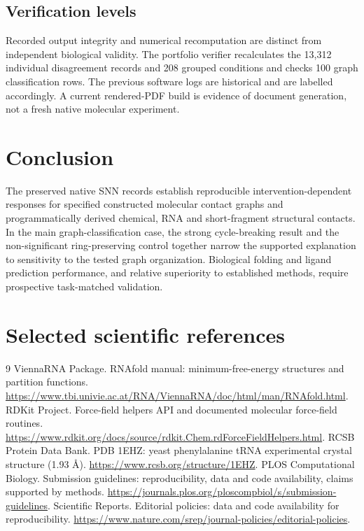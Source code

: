\documentclass[10pt,a4paper]{article}
\begin{document}
\subsection{Verification levels}
Recorded output integrity and numerical recomputation are distinct from independent biological validity. The portfolio verifier recalculates the 13,312 individual disagreement records and 208 grouped conditions and checks 100 graph classification rows. The previous software logs are historical and are labelled accordingly. A current rendered-PDF build is evidence of document generation, not a fresh native molecular experiment.

\section{Conclusion}
The preserved native SNN records establish reproducible intervention-dependent responses for specified constructed molecular contact graphs and programmatically derived chemical, RNA and short-fragment structural contacts. In the main graph-classification case, the strong cycle-breaking result and the non-significant ring-preserving control together narrow the supported explanation to sensitivity to the tested graph organization. Biological folding and ligand prediction performance, and relative superiority to established methods, require prospective task-matched validation.

\section{Selected scientific references}
\begin{thebibliography}{9}
 ViennaRNA Package. RNAfold manual: minimum-free-energy structures and partition functions. \url{https://www.tbi.univie.ac.at/RNA/ViennaRNA/doc/html/man/RNAfold.html}.
 RDKit Project. Force-field helpers API and documented molecular force-field routines. \url{https://www.rdkit.org/docs/source/rdkit.Chem.rdForceFieldHelpers.html}.
 RCSB Protein Data Bank. PDB 1EHZ: yeast phenylalanine tRNA experimental crystal structure (1.93 \AA). \url{https://www.rcsb.org/structure/1EHZ}.
 PLOS Computational Biology. Submission guidelines: reproducibility, data and code availability, claims supported by methods. \url{https://journals.plos.org/ploscompbiol/s/submission-guidelines}.
 Scientific Reports. Editorial policies: data and code availability for reproducibility. \url{https://www.nature.com/srep/journal-policies/editorial-policies}.
\end{thebibliography}
\clearpage\appendix
\end{document}
